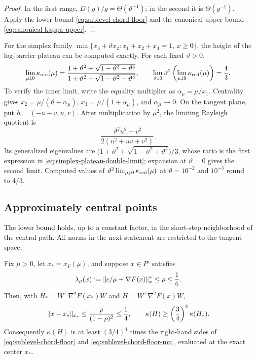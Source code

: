 \begin{proof}
In the first range, $D(g)/g=\Theta(\vartheta^{-1})$; in the second it is
$\Theta(g^{-1})$.  Apply the lower bound
\eqref{eq:sublevel-chord-floor} and the canonical upper bound
\eqref{eq:canonical-kappa-upper}.
\end{proof}

For the simplex family
$\min\{x_3+\vartheta x_2:x_1+x_2+x_3=1,\ x\geq0\}$, the height of the
log-barrier plateau can be computed exactly.  For each fixed
$\vartheta>0$,
\begin{equation}
 \lim_{\mu\downarrow0}\kappa_{\rm red}(\mu)
 =
 \frac{1+\vartheta^2+\sqrt{1-\vartheta^2+\vartheta^4}}
      {1+\vartheta^2-\sqrt{1-\vartheta^2+\vartheta^4}},
 \qquad
 \lim_{\vartheta\downarrow0}\vartheta^2
       \left(\lim_{\mu\downarrow0}\kappa_{\rm red}(\mu)\right)=\frac43.
 \label{eq:simplex-plateau-double-limit}
\end{equation}
To verify the inner limit, write the equality multiplier as
$\alpha_\mu=\mu/x_1$.  Centrality gives
$x_2=\mu/(\vartheta+\alpha_\mu)$,
$x_3=\mu/(1+\alpha_\mu)$, and $\alpha_\mu\to0$.  On the tangent plane, put
$h=(-u-v,u,v)$.  After multiplication by $\mu^2$, the limiting Rayleigh
quotient is
\[
 \frac{\vartheta^2u^2+v^2}{2(u^2+uv+v^2)}.
\]
Its generalized eigenvalues are
$\bigl(1+\vartheta^2\pm\sqrt{1-\vartheta^2+\vartheta^4}\bigr)/3$, whose
ratio is the first expression in
\eqref{eq:simplex-plateau-double-limit}; expansion at
$\vartheta=0$ gives the second limit.  Computed values of
$\vartheta^2\lim_{\mu\downarrow0}\kappa_{\rm red}(\mu)$ at
$\vartheta=10^{-2}$ and $10^{-3}$ round to $4/3$.

\subsection{Approximately central points}
\label{sec:conditioning-approximate}

The lower bound holds, up to a constant factor, in the short-step
neighborhood of the central path.  All norms in the next
statement are restricted to the tangent space.

\begin{corollary}
\label{cor:approximate-centrality-transfer}
Fix $\mu>0$, let $x_*=x_F(\mu)$, and suppose $x\in P^\circ$ satisfies
\begin{equation}
 \lambda_\mu(x):=\lVert c/\mu+\nabla F(x)\rVert_x^*\leq\rho\leq\frac16.
 \label{eq:approximate-centrality-decrement}
\end{equation}
Then, with $H_*=W^\top\nabla^2F(x_*)W$ and
$H=W^\top\nabla^2F(x)W$,
\begin{equation}
 \lVert x-x_*\rVert_{x_*}\leq\frac{\rho}{(1-\rho)^2}\leq\frac14,
 \qquad
 \kappa(H)\geq\left(\frac34\right)^4\kappa(H_*).
 \label{eq:approximate-centrality-transfer}
\end{equation}
Consequently $\kappa(H)$ is at least $(3/4)^4$ times the right-hand sides of
\eqref{eq:sublevel-chord-floor} and \eqref{eq:sublevel-chord-floor-mu},
evaluated at the exact center $x_*$.
\end{corollary}

